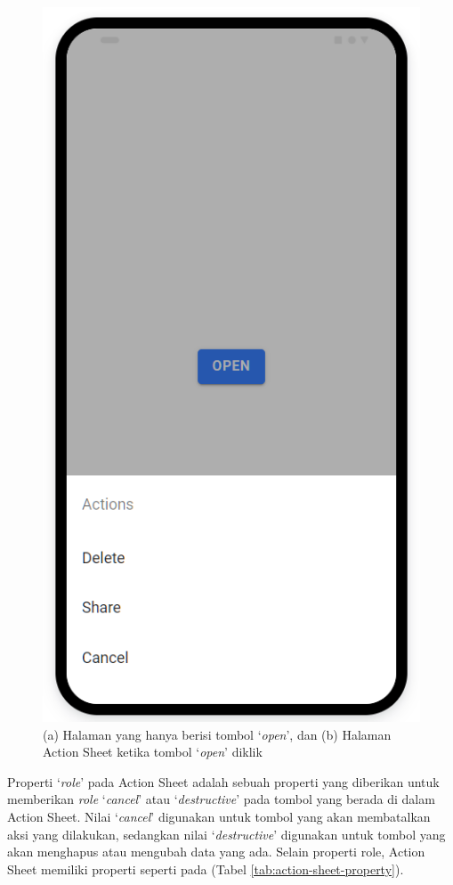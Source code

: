 \begin{figure}[H]
\begin{minipage}{0.25\linewidth}
        \includegraphics[scale=0.4]{Gambar/ionic-action-sheet-2.png}
        \subcaption{}
    \end{minipage}
    \caption[Gambar Hasil Action Sheet]{(a) Halaman yang hanya berisi tombol `\textit{open}', dan (b) Halaman Action Sheet ketika tombol `\textit{open}' diklik}
    \label{fig:action-sheet-example}
\end{figure}

Properti `\textit{role}' pada Action Sheet adalah sebuah properti yang diberikan untuk memberikan \textit{role} `\textit{cancel}' atau `\textit{destructive}' pada tombol yang berada di dalam Action Sheet. Nilai `\textit{cancel}' digunakan untuk tombol yang akan membatalkan aksi yang dilakukan, sedangkan nilai `\textit{destructive}' digunakan untuk tombol yang akan menghapus atau mengubah data yang ada. Selain properti role, Action Sheet memiliki properti seperti pada (Tabel \ref{tab:action-sheet-property}).

